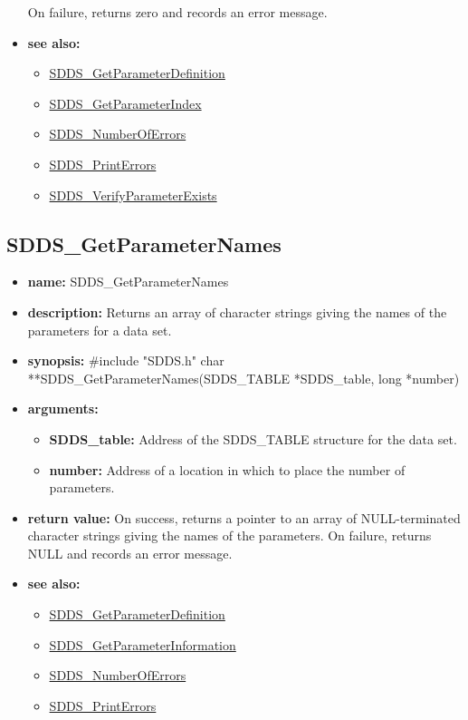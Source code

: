 \documentclass[11pt]{article}
\newcommand{\progref}[1]{\hyperref{SDDS_#1}{{\tt SDDS\_#1} (}{)}{SDDS_#1}}
\begin{document}
\begin{itemize}
\newline
On failure, returns zero and records an error message. 
\item {\bf see also:}
\begin{itemize}
\item \progref{GetParameterDefinition}
\item \progref{GetParameterIndex}
\item \progref{NumberOfErrors}
\item \progref{PrintErrors}
\item \progref{VerifyParameterExists}
\end{itemize}
\end{itemize}

\subsection{SDDS\_GetParameterNames}
\label{SDDS_GetParameterNames}

\begin{itemize}
\item {\bf name:}\newline
SDDS\_GetParameterNames
\item {\bf description:}\newline
Returns an array of character strings giving the names of the parameters for a data set.
\item {\bf synopsis:} \#include "SDDS.h"\newline
char **SDDS\_GetParameterNames(SDDS\_TABLE *SDDS\_table, long *number)
\item {\bf arguments:}
\begin{itemize}
\item {\bf SDDS\_table:} Address of the SDDS\_TABLE structure for the data set.
\item {\bf number:} Address of a location in which to place the number of parameters.
\end{itemize}
\item {\bf return value:}\newline
On success, returns a pointer to an array of NULL-terminated character strings giving the names of the parameters. On failure, returns NULL and records an error message.
\item {\bf see also:}
\begin{itemize}
\item \progref{GetParameterDefinition}
\item \progref{GetParameterInformation}
\item \progref{NumberOfErrors}
\item \progref{PrintErrors}
\end{itemize}
\end{itemize}
\end{document}
